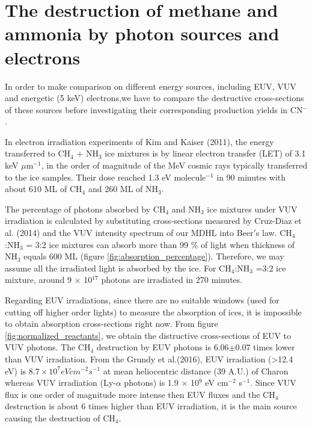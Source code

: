 \section{The destruction of methane and ammonia by photon sources and electrons}

In order to make comparison on different energy sources, including EUV, VUV and energetic (5 keV) electrons,we have to compare the destructive cross-sections of these sources before investigating their corresponding production yields in CN$^-$.

In electron irradiation experiments of Kim and Kaiser (2011)\cite{kim}, the energy transferred to CH$_4$ + NH$_3$ ice mixtures is by linear electron transfer (LET) of 3.1 keV $\mu$m$^{-1}$, in the order of magnitude of the MeV cosmic rays typically transferred to the ice samples. Their dose reached 1.3 eV molecule$^{-1}$ in 90 minutes with about 610 ML of CH$_4$ and 260 ML of NH$_3$. 

The percentage of photons absorbed by CH$_4$ and NH$_3$ ice mixtures under VUV irradiation is calculated by substituting cross-sections measured by Cruz-Diaz et al. (2014) \cite{cruz2014vacuum} and the VUV intensity spectrum of our MDHL into Beer$'$s law. CH$_4$:NH$_3$ = 3:2 ice mixtures can absorb more than 99 \% of light when thickness of NH$_3$ equals 600 ML (figure \ref{fig:absorption_percentage}). Therefore, we may assume all the irradiated light is absorbed by the ice. For CH$_4$:NH$_3$ =3:2 ice mixture, around 9 $\times$ 10$^{17}$ photons are irradiated in 270 minutes.

Regarding EUV irradiations, since there are no suitable windows (used for cutting off higher order lights) to measure the absorption of ices, it is impossible to obtain absorption cross-sections right now. From figure \ref{fig:normalized_reactants}, we obtain the distructive cross-sections of EUV to VUV photons. The CH$_4$ destruction by EUV photons is 6.06$\pm$0.07 times lower than VUV irradiation.  From the Grundy et al.(2016)\cite{grundy2016formation}, EUV irradiation (>12.4 eV) is $8.7 \times 10^7 eV cm^{-2} s^{-1}$ at mean heliocentric distance (39 A.U.) of Charon whereas VUV irradiation (Ly-$\alpha$ photons) is 1.9 $\times$ 10$^9$ eV cm$^{-2}$ s$^{-1}$. Since VUV flux is one order of magnitude more intense then EUV fluxes and the CH$_4$ destruction is about 6 times higher than EUV irradiation, it is the main source causing the destruction of CH$_4$.

